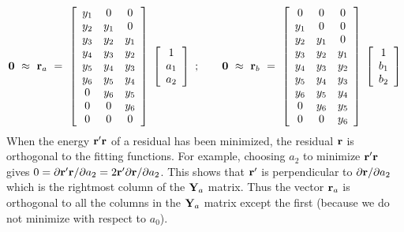 \begin{equation}
\bold 0
\ \approx\ \bold r_a \ =\ 
        \left[ 
        \begin{array}{ccc}
          y_1 & 0   & 0    \\
          y_2 & y_1 & 0    \\
          y_3 & y_2 & y_1  \\
          y_4 & y_3 & y_2  \\
          y_5 & y_4 & y_3  \\
          y_6 & y_5 & y_4  \\
          0   & y_6 & y_5  \\
          0   & 0   & y_6  \\
          0   & 0   & 0  
          \end{array} \right] 
        \; \left[ 
        \begin{array}{c}
          1   \\ 
          a_1 \\ 
          a_2 \end{array} \right]
\ ; \quad\quad
\bold 0
\ \approx\ \bold r_b \ =\ 
        \left[ 
        \begin{array}{ccc}
          0   & 0   & 0    \\
          y_1 & 0   & 0    \\
          y_2 & y_1 & 0    \\
          y_3 & y_2 & y_1  \\
          y_4 & y_3 & y_2  \\
          y_5 & y_4 & y_3  \\
          y_6 & y_5 & y_4  \\
          0   & y_6 & y_5  \\
          0   & 0   & y_6 
          \end{array} \right] 
        \; \left[ 
        \begin{array}{c}
          1   \\ 
          b_1 \\ 
          b_2 \end{array} \right]
\label{eqn:tworegrs}
\end{equation}
When the energy $\bold r'\bold r$
of a residual has been minimized,
the residual $\bold r$ is orthogonal to the fitting functions.
For example, choosing $a_2$ to minimize
$\bold r'\bold r$
gives
$0=\partial\bold r'\bold r/\partial a_2=2\bold r'\partial\bold r/\partial a_2$.
This shows that $\bold r'$ is perpendicular to $\partial \bold r / \partial a_2$
which is the rightmost column of the $\bold Y_a$ matrix.
Thus the vector $\bold r_a$
is orthogonal to all the columns in the $\bold Y_a$ matrix
except the first (because we do not minimize with respect to $a_0$).

